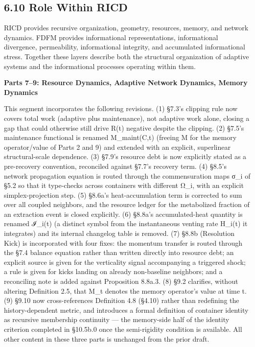 \documentclass[
]{article}
\begin{document}
\hypertarget{role-within-ricd}{%
\subsection{6.10 Role Within RICD}\label{role-within-ricd}}

RICD provides recursive organization, geometry, resources, memory, and
network dynamics. FDFM provides informational representations,
informational divergence, permeability, informational integrity, and
accumulated informational stress. Together these layers describe both
the structural organization of adaptive systems and the informational
processes operating within them.

\textbf{Parts 7--9: Resource Dynamics, Adaptive Network Dynamics, Memory
Dynamics}

This segment incorporates the following revisions. (1) §7.3's clipping
rule now covers total work (adaptive plus maintenance), not adaptive
work alone, closing a gap that could otherwise still drive R(t) negative
despite the clipping. (2) §7.5's maintenance functional is renamed
M\_maint(C,t) (freeing M for the memory operator/value of Parts 2 and 9)
and extended with an explicit, superlinear structural-scale dependence.
(3) §7.9's resource debt is now explicitly stated as a pre-recovery
convention, reconciled against §7.7's recovery term. (4) §8.5's network
propagation equation is routed through the commensuration maps σ\_i of
§5.2 so that it type-checks across containers with different Ω\_i, with
an explicit simplex-projection step. (5) §8.6a's heat-accumulation term
is corrected to sum over all coupled neighbors, and the resource ledger
for the metabolized fraction of an extraction event is closed
explicitly. (6) §8.8a's accumulated-heat quantity is renamed ℐ\_i(t) (a
distinct symbol from the instantaneous venting rate H\_i(t) it
integrates) and its internal changelog table is removed. (7) §8.8b
(Resolution Kick) is incorporated with four fixes: the momentum transfer
is routed through the §7.4 balance equation rather than written directly
into resource debt; an explicit source is given for the verticality
signal accompanying a triggered shock; a rule is given for kicks landing
on already non-baseline neighbors; and a reconciling note is added
against Proposition 8.8a.3. (8) §9.2 clarifies, without altering
Definition 2.5, that M\_t denotes the memory operator's value at time t.
(9) §9.10 now cross-references Definition 4.8 (§4.10) rather than
redefining the history-dependent metric, and introduces a formal
definition of container identity as recursive membership continuity ---
the memory-side half of the identity criterion completed in §10.5b.0
once the semi-rigidity condition is available. All other content in
these three parts is unchanged from the prior draft.
\end{document}

